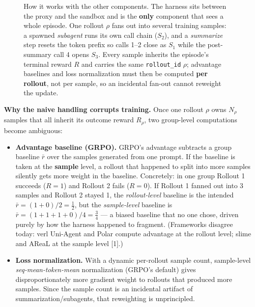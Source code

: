 \documentclass[
  paper=a4,
  ,captions=tableheading
]{scrartcl}
\providecommand{\tightlist}{%
  \setlength{\itemsep}{0pt}\setlength{\parskip}{0pt}}
\begin{document}
\begin{figure}[htbp]
{%
}
\caption{How it works with the other components. The harness sits between the proxy and the sandbox and is the \textbf{only} component that sees a whole episode. One rollout $\rho$ fans out into several training samples: a spawned \emph{subagent} runs its own call chain ($S_2$), and a \emph{summarize} step resets the token prefix so calls 1--2 close as $S_1$ while the post-summary call 4 opens $S_3$. Every sample inherits the episode's terminal reward $R$ and carries the same \texttt{rollout\_id} $\rho$; advantage baselines and loss normalization must then be computed \textbf{per rollout}, not per sample, so an incidental fan-out cannot reweight the update.}
\end{figure}

\textbf{Why the naive handling corrupts training.} Once one rollout
\(\rho\) owns \(N_\rho\) samples that all inherit its outcome reward
\(R_\rho\), two group-level computations become ambiguous:

\begin{itemize}
\tightlist
\item
  \textbf{Advantage baseline (GRPO).} GRPO's advantage subtracts a group
  baseline \(\bar r\) over the samples generated from one prompt. If the
  baseline is taken at the \textbf{sample} level, a rollout that
  happened to split into more samples silently gets more weight in the
  baseline. Concretely: in one group Rollout 1 succeeds (\(R=1\)) and
  Rollout 2 fails (\(R=0\)). If Rollout 1 fanned out into 3 samples and
  Rollout 2 stayed 1, the \emph{rollout-level} baseline is the intended
  \(\bar r=(1+0)/2=\tfrac12\), but the \emph{sample-level} baseline is
  \(\bar r=(1+1+1+0)/4=\tfrac34\) --- a biased baseline that no one
  chose, driven purely by how the harness happened to fragment.
  (Frameworks disagree today: verl Uni-Agent and Polar compute advantage
  at the rollout level; slime and AReaL at the sample level {[}1{]}.)
\item
  \textbf{Loss normalization.} With a dynamic per-rollout sample count,
  sample-level \emph{seq-mean-token-mean} normalization (GRPO's default)
  gives disproportionately more gradient weight to rollouts that
  produced more samples. Since the sample count is an incidental
  artifact of summarization/subagents, that reweighting is unprincipled.
\end{itemize}
\end{document}
